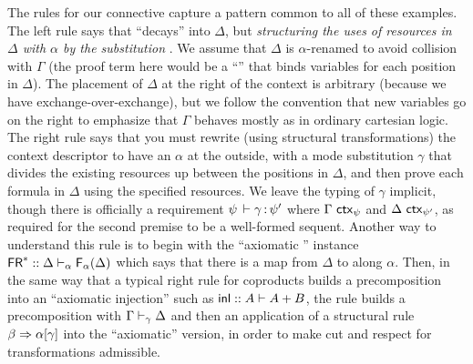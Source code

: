 The rules for our  connective capture a pattern common to all of
these examples.  The left \FL rule says that \F{\alpha}{\Delta}
``decays'' into $\Delta$, but \emph{structuring the uses of resources in
  $\Delta$ with $\alpha$ by the substitution }.
We assume that $\Delta$ is $\alpha$-renamed to avoid collision with
$\Gamma$ (the proof term here would be a ``'' that binds
variables for each position in $\Delta$).  The placement of $\Delta$ at
the right of the context is arbitrary (because we have
exchange-over-exchange), but we follow the convention that new variables
go on the right to emphasize that $\Gamma$ behaves mostly as in ordinary
cartesian logic.  The right \FR\/ rule says that you must rewrite (using
structural transformations) the context descriptor to have an $\alpha$
at the outside, with a mode substitution $\gamma$ that divides the
existing resources up between the positions in $\Delta$, and then prove
each formula in $\Delta$ using the specified resources.  We leave the
typing of $\gamma$ implicit, though there is officially a requirement
$\psi \, \vdash \gamma \, \mathit{:} \, \psi'$ where $\Gamma \,\, \mathsf{ctx}_{\psi}$ and
$\Delta \,\, \mathsf{ctx}_{\psi'}$, as required for the second premise to be a
well-formed sequent.  Another way to understand this rule is to begin
with the ``axiomatic \FR'' instance 
$\mathsf{FR}^* :: {\Delta \vdash_{\alpha} \mathsf{F}_{\alpha}(\Delta)}{}$
which says that there is a map from $\Delta$ to \F{\alpha}{\Delta} along
$\alpha$.  Then, in the same way that a typical right rule for
coproducts builds a precomposition into an ``axiomatic injection'' such
as $\mathsf{inl} :: A \vdash A + B$, the \FR\/ rule builds a precomposition
with $\Gamma \vdash_{\gamma} \Delta$ and then an application of a
structural rule $\beta \Rightarrow \alpha[\gamma]$ into the ``axiomatic''
version, in order to make cut and respect for transformations
admissible.


